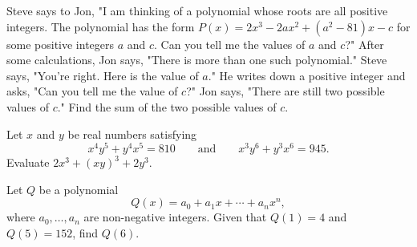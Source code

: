 %	













\begin{question}[name={2015 AIME II, \href{https://artofproblemsolving.com/community/c4p4652179}{Problem 6}}]
	Steve says to Jon, "I am thinking of a polynomial whose roots are all positive integers. The polynomial has the form $P(x)=2x^3-2ax^2+(a^2-81)x-c$ for some positive integers $a$ and $c$. Can you tell me the values of $a$ and $c$?" After some calculations, Jon says, "There is more than one such polynomial." Steve says, "You’re right. Here is the value of $a$." He writes down a positive integer and asks, "Can you tell me the value of $c$?" Jon says, "There are still two possible values of $c$." Find the sum of the two possible values of $c$.
\end{question}


%	








\begin{question}[name={2015 AIME II, \href{https://artofproblemsolving.com/community/c4p4652236}{Problem 14}}]
	Let $x$ and $y$ be real numbers satisfying $$x^4y^5+y^4x^5=810 \qquad \text{and} \qquad x^3y^6+y^3x^6=945.$$ Evaluate $2x^3+(xy)^3+2y^3$.
\end{question}


%	



\begin{question}[name={2015 HMMT, Algebra, \href{https://artofproblemsolving.com/community/c129h1071065p4658474}{Problem 1}}]
	Let $Q$ be a polynomial\[Q(x)=a_0+a_1x+\cdots+a_nx^n,\]where $a_0,\ldots,a_n$ are non-negative integers. Given that $Q(1)=4$ and $Q(5)=152$, find $Q(6)$.
\end{question}




%	





